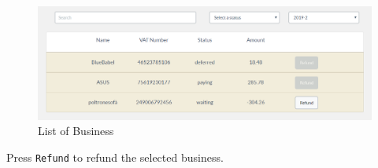 	\begin{figure}[H]
		\includegraphics[width=15cm]{res/images/business_list.png}
		\centering
		\caption{List of Business}
	\end{figure}
	\noindent Press \texttt{Refund} to refund the selected business.\\
